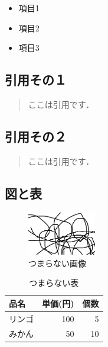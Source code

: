 \documentclass[a4paper,11pt,twocolumn]{ltjsarticle} %
\begin{document}
\begin{itemize}
\item 項目1
\item 項目2
\item 項目3
\end{itemize}

%
%

\subsection{引用その１}

\begin{quote}
ここは引用です．
\end{quote}

\subsection{引用その２}

\begin{quotation}
ここは引用です．
\end{quotation}

\subsection{図と表}

\begin{figure}[b] %
\centering %
\includegraphics[width=3cm]{images/fig1.png}
\caption{つまらない画像}
\label{fig:fig1}
\end{figure} %

\begin{table}[b] %
\centering %
\begin{tabular}{|l||r|r|}
品名 & 単価(円) & 個数 \\
\hline
リンゴ & 100 & 5 \\
みかん & 50 & 10
\end{tabular}
\caption{つまらない表}
\label{tab:tab1}
\end{table} %
\end{document}
